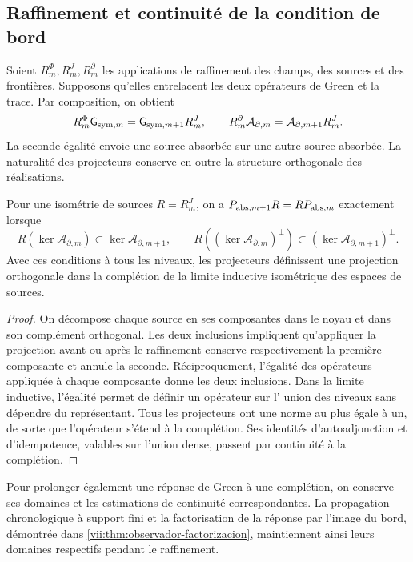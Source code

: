\subsection{Raffinement et continuité de la condition de bord}
\label{vii:subsec:refinamiento-absorcion}

Soient \(R_m^\Phi,R_m^J,R_m^\partial\) les applications de raffinement des
champs, des sources et des frontières. Supposons qu'elles entrelacent les deux opérateurs de Green et la
trace. Par composition, on obtient
\begin{equation}
 R_m^\Phi \mathsf{G}_{{\rm sym},m}=\mathsf{G}_{{\rm sym},m+1}R_m^J,\qquad
 R_m^\partial\mathcal A_{\partial,m}
 =\mathcal A_{\partial,m+1}R_m^J.
 \label{vii:eq:refinamiento-lectura-absorcion}
\end{equation}
La seconde égalité envoie une source absorbée sur une autre source absorbée.
La naturalité des projecteurs conserve en outre la structure
orthogonale des réalisations.

\begin{proposition}
\label{vii:prop:naturalidad-proyeccion-absorcion}
Pour une isométrie de sources \(R=R_m^J\), on a \(P_{{\rm abs},m+1}R=RP_{{\rm abs},m}\) exactement lorsque
\[
 R(\ker\mathcal A_{\partial,m})
       \subset\ker\mathcal A_{\partial,m+1},\qquad
 R((\ker\mathcal A_{\partial,m})^\perp)
       \subset(\ker\mathcal A_{\partial,m+1})^\perp.
\]
Avec ces conditions à tous les niveaux, les projecteurs définissent une projection orthogonale dans la complétion de la limite inductive isométrique des espaces de sources.
\end{proposition}
\begin{proof}
On décompose chaque source en ses composantes dans le noyau et dans son
complément orthogonal. Les deux inclusions impliquent qu'appliquer la
projection avant ou après le raffinement conserve respectivement la
première composante et annule la seconde. Réciproquement, l'égalité des
opérateurs appliquée à chaque composante donne les deux inclusions.
Dans la limite inductive, l'égalité permet de définir un opérateur sur l'
union des niveaux sans dépendre du représentant. Tous les projecteurs
ont une norme au plus égale à un, de sorte que l'opérateur s'étend à la
complétion. Ses identités d'autoadjonction et d'idempotence, valables sur
l'union dense, passent par continuité à la complétion.
\end{proof}

Pour prolonger également une réponse de Green à une complétion, on
conserve ses domaines et les estimations de continuité correspondantes.
La propagation chronologique à support fini et la factorisation de la
réponse par l'image du bord, démontrée dans
\ref{vii:thm:observador-factorizacion}, maintiennent ainsi leurs domaines
respectifs pendant le raffinement.

